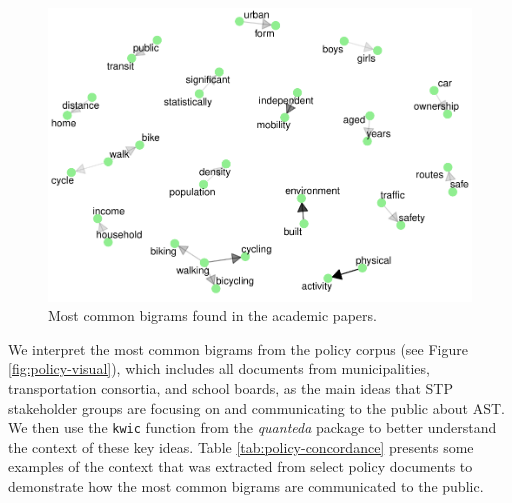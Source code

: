 \documentclass[]{elsarticle} %
\begin{document}
\begin{figure}

{\centering \includegraphics[width=1\linewidth]{AST-Framing-Ontario_files/figure-latex/academic-visual-1} 

}

\caption{\label{fig:academic-visual}Most common bigrams found in the academic papers.}\label{fig:academic-visual}
\end{figure}

We interpret the most common bigrams from the policy corpus (see Figure
\ref{fig:policy-visual}), which includes all documents from
municipalities, transportation consortia, and school boards, as the main
ideas that STP stakeholder groups are focusing on and communicating to
the public about AST. We then use the \texttt{kwic} function from the
\emph{quanteda} package to better understand the context of these key
ideas. Table \ref{tab:policy-concordance} presents some examples of the
context that was extracted from select policy documents to demonstrate
how the most common bigrams are communicated to the public.
\end{document}
